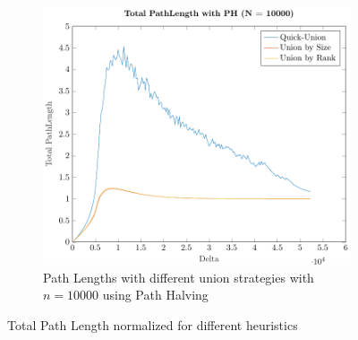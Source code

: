 \begin{figure}[ht]
\begin{subfigure}{0.32\textwidth}
    \end{subfigure}%
    \hfill
    \begin{subfigure}{0.32\textwidth}
        \centering
        \includegraphics[width=\textwidth]{../images/plotPHFull10000_PathLength.pdf}
        \caption{Path Lengths with different union strategies with $n = 10000$ using Path Halving}
    \end{subfigure}

    \caption{Total Path Length normalized for different heuristics}
    \label{fig:tplH}
\end{figure}

